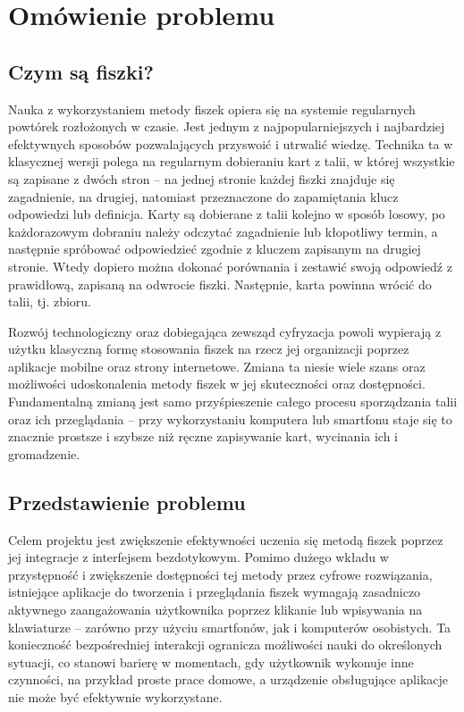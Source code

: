 \chapter{Omówienie problemu}

\section{Czym są fiszki?}

Nauka z wykorzystaniem metody fiszek opiera się na systemie regularnych powtórek rozłożonych w czasie. Jest jednym z najpopularniejszych i najbardziej efektywnych sposobów pozwalających przyswoić i utrwalić wiedzę. Technika ta w klasycznej wersji polega na regularnym dobieraniu kart z talii, w której wszystkie są zapisane z dwóch stron – na jednej stronie każdej fiszki znajduje się zagadnienie, na drugiej, natomiast przeznaczone do zapamiętania klucz odpowiedzi lub definicja. Karty są dobierane z talii kolejno w sposób losowy, po każdorazowym dobraniu należy odczytać zagadnienie lub kłopotliwy termin, a następnie spróbować odpowiedzieć zgodnie z kluczem zapisanym na drugiej stronie. Wtedy dopiero można dokonać porównania i zestawić swoją odpowiedź z prawidłową, zapisaną na odwrocie fiszki. Następnie, karta powinna wrócić do talii, tj. zbioru.

Rozwój technologiczny oraz dobiegająca zewsząd cyfryzacja powoli wypierają z użytku klasyczną formę stosowania fiszek na rzecz jej organizacji poprzez aplikacje mobilne oraz strony internetowe. Zmiana ta niesie wiele szans oraz możliwości udoskonalenia metody fiszek w jej skuteczności oraz dostępności. Fundamentalną zmianą jest samo przyśpieszenie całego procesu sporządzania talii oraz ich przeglądania – przy wykorzystaniu komputera lub smartfonu staje się to znacznie prostsze i szybsze niż ręczne zapisywanie kart, wycinania ich i gromadzenie.

\section{Przedstawienie problemu}

Celem projektu jest zwiększenie efektywności uczenia się metodą fiszek poprzez jej integracje z interfejsem bezdotykowym. Pomimo dużego wkładu w przystępność i zwiększenie dostępności tej metody przez cyfrowe rozwiązania, istniejące aplikacje do tworzenia i przeglądania fiszek wymagają zasadniczo aktywnego zaangażowania użytkownika poprzez klikanie lub wpisywania na klawiaturze – zarówno przy użyciu smartfonów, jak i komputerów osobistych. Ta konieczność bezpośredniej interakcji ogranicza możliwości nauki do określonych sytuacji, co stanowi barierę w momentach, gdy użytkownik wykonuje inne czynności, na przykład proste prace domowe, a urządzenie obsługujące aplikacje nie może być efektywnie wykorzystane.

